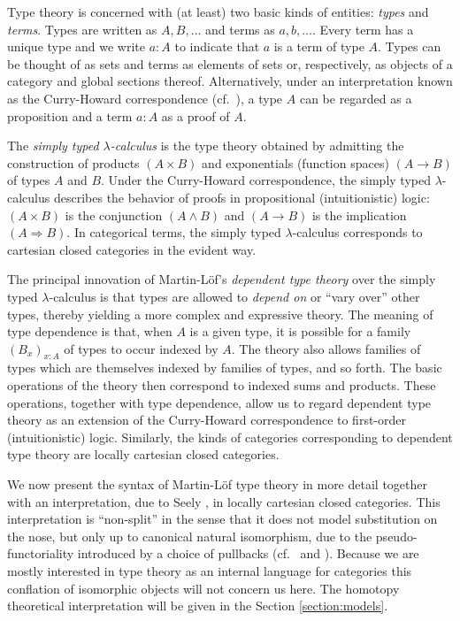\documentclass[12pt]{amsart}
\renewcommand{\implies}{\Rightarrow}
\theoremstyle{definition}
\theoremstyle{remark}
\begin{document}
Type theory is concerned with (at least) two basic kinds of
entities: \emph{types} and \emph{terms}.  Types are
written as $A,B,\ldots$ and terms as $a,b,\ldots$.  Every
term has a unique type and we write $a:A$ to indicate that $a$ is a
term of type $A$.  Types can be thought of as sets and terms as
elements of sets or, respectively, as objects of a category and global sections
thereof.  Alternatively, under an interpretation known as the
Curry-Howard correspondence (cf.~\cite{Nordstrom:PMLTT}), a type $A$ can be
regarded as a proposition and a term $a:A$ as a proof of $A$.  

The \emph{simply typed $\lambda$-calculus} is the type theory obtained
by admitting the construction of products $(A\times B)$ and
exponentials (function
spaces) $(A\rightarrow B)$ of types $A$ and $B$.  Under the
Curry-Howard correspondence, the simply typed $\lambda$-calculus
describes the behavior of proofs in propositional (intuitionistic) logic:
$(A\times B)$ is the conjunction $(A\wedge B)$ and $(A\rightarrow
B)$ is the implication $(A\implies B)$.
In categorical terms, the simply typed $\lambda$-calculus corresponds
to cartesian closed categories in the evident way.

The principal innovation of Martin-L\"{o}f's \emph{dependent type theory}
over the simply typed $\lambda$-calculus is that types are allowed to
\emph{depend on} or ``vary over'' other types, thereby yielding a
more complex and expressive theory.  The meaning of type
dependence is that, when $A$ is a given type, it is possible for a family
$(B_{x})_{x:A}$ of types to occur indexed by $A$.  The theory also allows
families of types which are themselves indexed by families of types,
and so forth.  The basic operations of the theory then correspond to
indexed sums and products.  These operations, together with type
dependence, allow us to regard dependent type theory as an extension
of the Curry-Howard correspondence to first-order (intuitionistic)
logic.  Similarly, the kinds of categories corresponding to dependent
type theory are locally cartesian closed categories.

We now present the syntax of Martin-L\"{o}f type theory in more
detail together with an interpretation, due to Seely
\cite{Seely:LCCCTT}, in locally cartesian closed categories.  This
interpretation is ``non-split'' in the sense that it does not model
substitution on the nose, but only up to canonical natural
isomorphism, due to the pseudo-functoriality introduced by a choice of
pullbacks (cf.~\cite{Curien:SUI} and \cite{Hofmann:OITTLCCC}).
Because we are mostly interested in type theory as an internal
language for categories this conflation of isomorphic objects will not
concern us here.  The homotopy theoretical interpretation will be
given in the Section \ref{section:models}.
\end{document}
